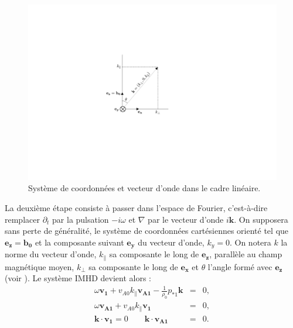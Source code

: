 \label{sec-112}
\begin{figure}
 \centering
\includegraphics[width=0.6\linewidth,trim=9.3cm 7.8cm 13cm 7cm, clip=true]{./Part_1/images/schema_kplan.pdf}
\caption{Système de coordonnées et vecteur d'onde dans le cadre linéaire.}
\label{fig:schema_kplan}
\end{figure}

La deuxième étape consiste à passer dans l'espace de Fourier, c'est-à-dire remplacer $\partial_t$ par la pulsation $-i\omega$ et $\nabla$ par le vecteur d'onde $i\boldsymbol{k}$. On supposera sans perte de généralité, le système de coordonnées cartésiennes orienté tel que $\boldsymbol{e_z} = \boldsymbol{b_0}$ et la composante suivant $\boldsymbol{e_y}$ du vecteur d'onde, $k_y = 0$. On notera $k$ la norme du vecteur d'onde, $k_{\parallel}$ sa composante le long de $\boldsymbol{e_z}$, parallèle au champ magnétique moyen, $k_{\perp}$ sa composante le long de $\boldsymbol{e_x}$ et $\theta$ l'angle formé avec $\boldsymbol{e_z}$ (voir ).
Le système \acs{IMHD} devient alors : 
\begin{eqnarray}
 \label{eq:lin_inc_v} \omega \boldsymbol{v_{1}}  + v_{A0} k_{\parallel} \boldsymbol{v_{A1}} - \frac{1}{\rho_0}  p_{*1} \boldsymbol{k}&=& 0 ,\\
 \label{eq:lin_inc_b} \omega \boldsymbol{v_{A1}}  +  v_{A0} k_{\parallel}  \boldsymbol{v_{1}}&=& 0 ,\\
 \label{eq:lin_inc_r} \boldsymbol{k} \cdot \boldsymbol{v_{1}} = 0 \qquad \boldsymbol{k} \cdot \boldsymbol{v_{A1}}  &=& 0 .
\end{eqnarray}

